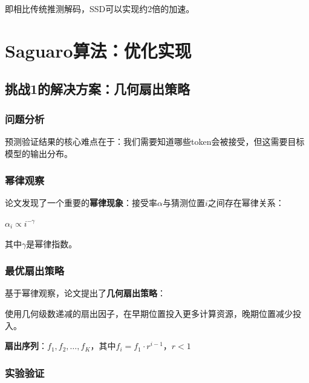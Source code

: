 \documentclass[11pt,a4paper]{article}
\newcommand{\term}[1]{\textcolor{primarypurple}{\textbf{#1}}}
\begin{document}
即相比传统推测解码，SSD可以实现约2倍的加速。

\newpage

\section{Saguaro算法：优化实现}

\subsection{挑战1的解决方案：几何扇出策略}

\subsubsection{问题分析}

预测验证结果的核心难点在于：我们需要知道哪些token会被接受，但这需要目标模型的输出分布。

\subsubsection{幂律观察}

论文发现了一个重要的\term{幂律现象}：接受率$\alpha$与猜测位置$i$之间存在幂律关系：

\begin{equationbox}
  \centering
  $\alpha_i \propto i^{-\gamma}$
\end{equationbox}

其中$\gamma$是幂律指数。

\subsubsection{最优扇出策略}

基于幂律观察，论文提出了\term{几何扇出策略}：

\begin{innovationbox}[几何扇出]
  使用几何级数递减的扇出因子，在早期位置投入更多计算资源，晚期位置减少投入。
  
  \textbf{扇出序列}：$f_1, f_2, \ldots, f_K$，其中$f_i = f_1 \cdot r^{i-1}$，$r < 1$
\end{innovationbox}

\subsubsection{实验验证}
\end{document}
